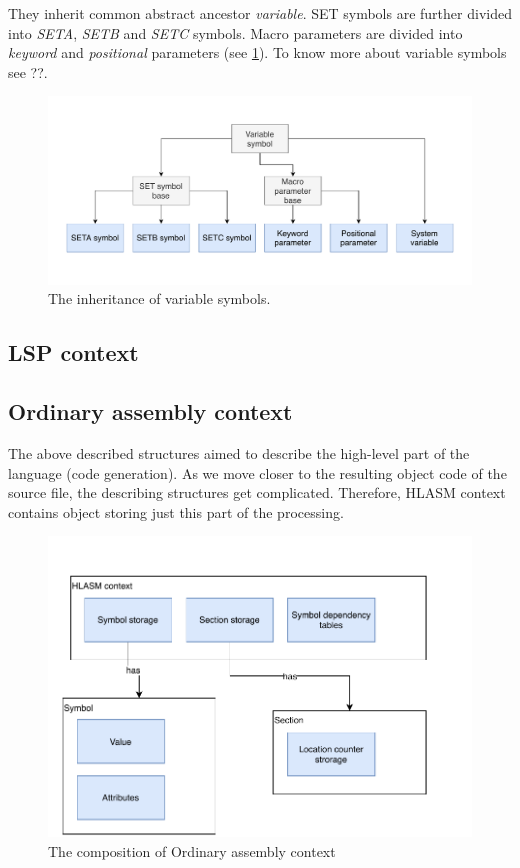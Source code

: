 They inherit common abstract ancestor \emph{variable}. SET symbols are further divided into \emph{SETA}, \emph{SETB} and \emph{SETC} symbols. Macro parameters are divided into \emph{keyword} and \emph{positional} parameters (see \cref{fig06:var}). To know more about variable symbols see ??. 

\begin{figure}
	\centering
	\includegraphics[width=\textwidth]{img/variable_arch}
	\caption{The inheritance of variable symbols.}
	\label{fig06:var}
\end{figure}

\subsection{LSP context}

\subsection{Ordinary assembly context}

The above described structures aimed to describe the high-level part of the language (code generation). As we move closer to the resulting object code of the source file, the describing structures get complicated. Therefore, HLASM context contains object storing just this part of the processing.

\begin{figure}
	\centering
	\includegraphics[width=\textwidth / 2]{img/ord_ctx_arch}
	\caption{The composition of Ordinary assembly context}
	\label{fig06:ord_ctx}
\end{figure}

